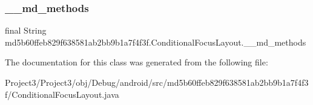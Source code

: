 \subsubsection{\texorpdfstring{\+\_\+\+\_\+md\+\_\+methods}{\_\_md\_methods}}
{\footnotesize\ttfamily final String md5b60ffeb829f638581ab2bb9b1a7f4f3f.\+Conditional\+Focus\+Layout.\+\_\+\+\_\+md\+\_\+methods\hspace{0.3cm}{\ttfamily [static]}}



The documentation for this class was generated from the following file\+:\begin{DoxyCompactItemize}
\item 
Project3/\+Project3/obj/\+Debug/android/src/md5b60ffeb829f638581ab2bb9b1a7f4f3f/Conditional\+Focus\+Layout.\+java\end{DoxyCompactItemize}
